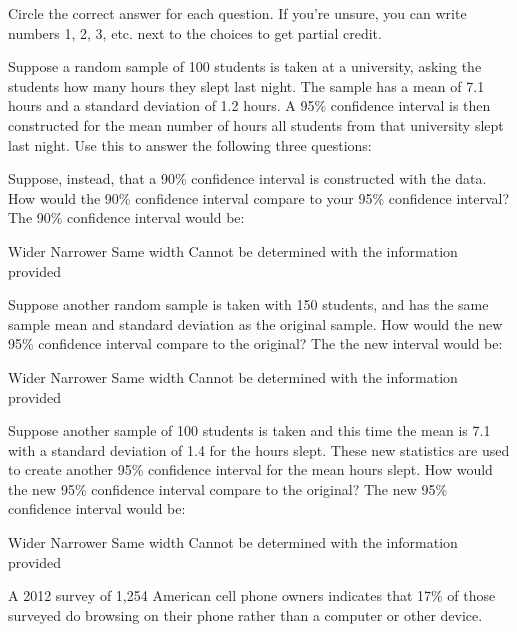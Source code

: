 \documentclass{article}
\begin{document}
	Circle the correct answer for each question.  If you're unsure, you can write numbers 1, 2, 3, etc. next to the choices to get partial credit.\\[.5cm]
	
	\begin{mcquestions}
		\begin{mcquestioninstruction}
			Suppose a random sample of 100 students is taken at a university, asking the students how many hours they slept last night. The sample has a mean of 7.1 hours and a standard deviation of 1.2 hours. A 95\% confidence interval is then constructed for the mean number of hours all students from that university slept last night.  Use this to answer the following three questions:
		\end{mcquestioninstruction}
		\question Suppose, instead, that a 90\% confidence interval is constructed with the data. How would the 90\% confidence interval compare to your 95\% confidence interval?  The 90\% confidence interval would be:
		\begin{mcanswerslist}
			\answer  Wider
			\answer[correct] Narrower
			\answer Same width
			\answer Cannot be determined with the information provided
		\end{mcanswerslist}
		
		\question[follow] Suppose another random sample is taken with 150 students, and has the same sample mean and standard deviation as the original sample. How would the new 95\% confidence interval compare to the original? The the new interval would be:
		\begin{mcanswerslist}
			\answer  Wider
			\answer[correct] Narrower
			\answer Same width
			\answer Cannot be determined with the information provided
		\end{mcanswerslist}
		
		\question[follow] Suppose another sample of 100 students is taken and this time the mean is 7.1 with a standard deviation of 1.4 for the hours slept. These new statistics are used to create another 95\% confidence interval for the mean hours slept. How would the new 95\% confidence interval compare to the original? The new 95\% confidence interval would be:
		\begin{mcanswerslist}
			\answer[correct]  Wider
			\answer Narrower
			\answer Same width
			\answer Cannot be determined with the information provided
		\end{mcanswerslist}
		
		\question A 2012 survey of 1,254 American cell phone owners indicates that 17\% of those surveyed do browsing on their phone rather than a computer or other device.
		

\end{mcquestions}
\end{document}
